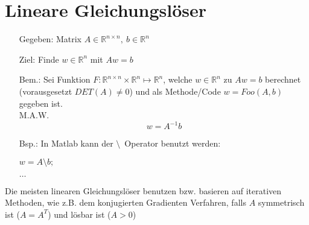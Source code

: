 \section{Lineare Gleichungslöser}
\label{chap:LGSsolvers}

\begin{itemize}
	\item[Gegeben:] Matrix $ A \in \mathbb{R}^{n\times n},\ b \in \mathbb{R}^n$
	\item[Ziel:] Finde $w\in \mathbb{R}^n$ mit $Aw=b$
	\item[Bem.:] Sei Funktion $F:\mathbb{R}^{n\times n} \times \mathbb{R}^n \mapsto \mathbb{R}^n$, welche $w \in \mathbb{R}^n$ zu $Aw=b$ berechnet (vorausgesetzt $DET(A) \neq 0$) und als Methode/Code $w=Foo(A,b)$ gegeben ist.\\
	M.A.W. $$w = A^{-1}b$$
	\item[Bsp.:] In Matlab kann der \glqq$\setminus$\grqq\  Operator benutzt werden:\\
	\begin{algorithmic}
		\State $w = A \setminus b;$
		\EndFunction
	\end{algorithmic}
$\dots$
\end{itemize}


Die meisten linearen Gleichungslöser benutzen bzw. basieren auf iterativen Methoden, wie z.B. dem konjugierten Gradienten Verfahren, falls $A$ symmetrisch ist ($A=A^T$) und lösbar ist ($A>0$)\\

